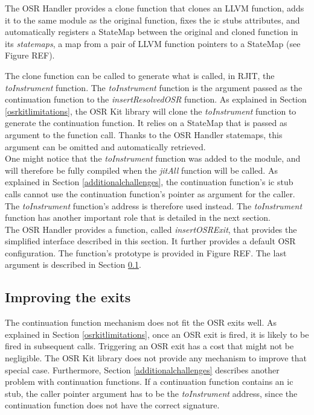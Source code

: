 The OSR Handler provides a clone function that clones an LLVM function, adds it to the same module as the original function, fixes the ic stubs attributes, and automatically registers a StateMap between the original and cloned function in its \textit{statemaps}, a map from a pair of LLVM function pointers to a StateMap (see Figure REF).\\

The clone function can be called to generate what is called, in RJIT, the \textit{toInstrument} function.
The \textit{toInstrument} function is the argument passed as the continuation function to the \textit{insertResolvedOSR} function.
As explained in Section \ref{osrkitlimitations}, the OSR Kit library will clone the \textit{toInstrument} function to generate the continuation function.
It relies on a StateMap that is passed as argument to the function call. 
Thanks to the OSR Handler statemaps, this argument can be omitted and automatically retrieved.\\

One might notice that the \textit{toInstrument} function was added to the module, and will therefore be fully compiled when the \textit{jitAll} function will be called.
As explained in Section \ref{additionalchallenges}, the continuation function's ic stub calls cannot use the continuation function's pointer as argument for the caller. 
The \textit{toInstrument} function's address is therefore used instead.
The \textit{toInstrument} function has another important role that is detailed in the next section.\\

The OSR Handler provides a function, called \textit{insertOSRExit}, that provides the simplified interface described in this section.
It further provides a default OSR configuration.
The function's prototype is provided in Figure REF.
The last argument is described in Section \ref{improvingexits}.\\


\subsection{Improving the exits}\label{improvingexits}

The continuation function mechanism does not fit the OSR exits well.
As explained in Section \ref{osrkitlimitations}, once an OSR exit is fired, it is likely to be fired in subsequent calls.
Triggering an OSR exit has a cost that might not be negligible.
The OSR Kit\cite{OSRKit} library does not provide any mechanism to improve that special case.
Furthermore, Section \ref{additionalchallenges} describes another problem with continuation functions.
If a continuation function contains an ic stub, the caller pointer argument has to be the \textit{toInstrument} address, since the continuation function does not have the correct signature.\\

